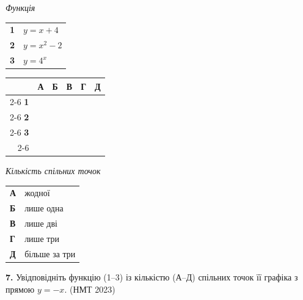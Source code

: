 \documentclass[14pt]{extarticle}
\newcommand{\nmtyear}[1]{\hfill{\small\color{yearcolor}(НМТ #1)}}
\begin{document}
\vspace{0.3cm}

\noindent
\begin{minipage}[t]{0.45\textwidth}
    \textit{Функція} \par \vspace{0.2cm}
    \begin{tabular}{@{}p{0.5cm} p{5cm}@{}}
    \textbf{1} & $y=x+4$ \\[0.3cm]
    \textbf{2} & $y=x^2-2$ \\[0.3cm]
    \textbf{3} & $y=4^x$ \\
    \end{tabular}
    
    \vspace{0.5cm}
    
    \begingroup
    \setlength{\tabcolsep}{4pt}
    \renewcommand{\arraystretch}{1.2}
    \small
    \begin{tabular}{r|c|c|c|c|c|}
         \multicolumn{1}{c}{} & \multicolumn{1}{c}{\textbf{А}} & \multicolumn{1}{c}{\textbf{Б}} & \multicolumn{1}{c}{\textbf{В}} & \multicolumn{1}{c}{\textbf{Г}} & \multicolumn{1}{c}{\textbf{Д}} \\ \cline{2-6}
         \textbf{1} & & & & & \\ \cline{2-6}
         \textbf{2} & & & & & \\ \cline{2-6}
         \textbf{3} & & & & & \\ \cline{2-6}
    \end{tabular}
    \endgroup
\end{minipage}%
\hfill
\begin{minipage}[t]{0.50\textwidth}
    \textit{Кількість спільних точок} \par \vspace{0.2cm}
    \begin{tabular}{@{}p{0.5cm} p{7.5cm}@{}}
    \textbf{А} & жодної \\[0.3cm]
    \textbf{Б} & лише одна \\[0.3cm]
    \textbf{В} & лише дві \\[0.3cm]
    \textbf{Г} & лише три \\[0.3cm]
    \textbf{Д} & більше за три \\
    \end{tabular}
\end{minipage}

\vspace{0.7cm}

\noindent\textbf{7.} Увідповідніть функцію (1–3) із кількістю (А–Д) спільних точок її графіка з прямою $y = -x$. \nmtyear{2023}
\vspace{0.3cm}
\end{document}
